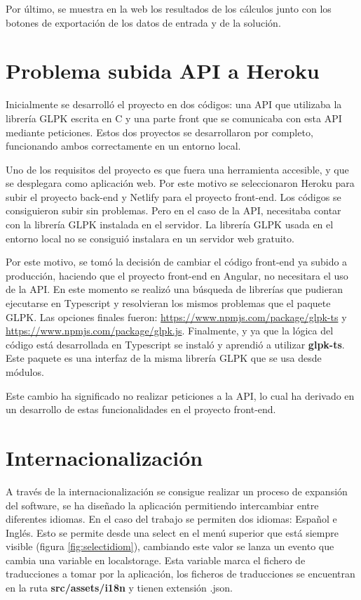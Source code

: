 Por último, se muestra en la web los resultados de los cálculos junto con los botones de exportación de los datos de entrada y de la solución. 

\section{Problema subida API a Heroku}

Inicialmente se desarrolló el proyecto en dos códigos: una API que utilizaba la librería GLPK escrita en C y una parte front que se comunicaba con esta API mediante peticiones. Estos dos proyectos se desarrollaron por completo, funcionando ambos correctamente en un entorno local.

Uno de los requisitos del proyecto es que fuera una herramienta accesible, y que se desplegara como aplicación web. Por este motivo se seleccionaron Heroku para subir el proyecto back-end y Netlify para el proyecto front-end. Los códigos se consiguieron subir sin problemas. Pero en el caso de la API, necesitaba contar con la librería GLPK instalada en el servidor.  La librería GLPK usada en el entorno local no se consiguió instalara en un servidor web gratuito. 

Por este motivo, se tomó la decisión de cambiar el código front-end ya subido a producción, haciendo que el proyecto front-end en Angular, no necesitara el uso de la API. En este momento se realizó una búsqueda de librerías que pudieran ejecutarse en Typescript y resolvieran los mismos problemas que  el paquete GLPK. Las opciones finales fueron: \url{https://www.npmjs.com/package/glpk-ts} y \url{https://www.npmjs.com/package/glpk.js}. Finalmente, y ya que la lógica del código está desarrollada en Typescript se instaló y aprendió a utilizar \textbf{glpk-ts}. Este paquete es una interfaz de la misma librería GLPK \cite{glpk:package} que se usa desde módulos. 

Este cambio ha significado no realizar peticiones a la API, lo cual ha derivado en un desarrollo de estas funcionalidades en el proyecto front-end. 

\section{Internacionalización}

A través de la internacionalización se consigue realizar un proceso de expansión del software, se ha diseñado la aplicación permitiendo intercambiar entre diferentes idiomas. En el caso del trabajo se permiten dos idiomas: Español e Inglés. Esto se permite desde una select en el menú superior que está siempre visible (figura \ref{fig:selectidiom}), cambiando este valor se lanza un evento que cambia una variable en localstorage. Esta variable marca el fichero de traducciones a tomar por la aplicación, los ficheros de traducciones se encuentran en la ruta \textbf{src/assets/i18n} y tienen extensión .json.

